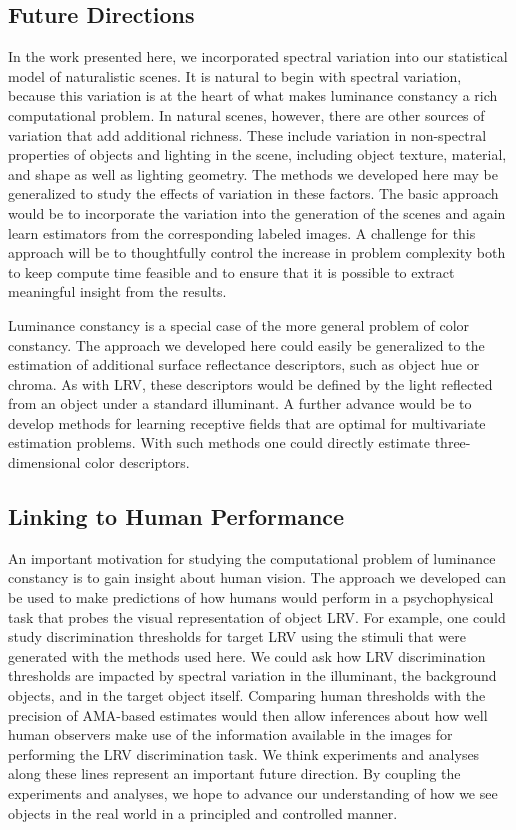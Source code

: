 \documentclass{jov}
\begin{document}
\subsection{Future Directions}
In the work presented here, we incorporated spectral variation into our statistical model
of naturalistic scenes.
It is natural to begin with spectral variation, because this variation is at the heart of
what makes luminance constancy a rich computational problem.
In natural scenes, however, there are other sources of variation that add additional
richness.
These include variation in non-spectral properties of objects and lighting in the scene, including
object texture, material, and shape as well as lighting geometry.
The methods we developed here may be generalized to study the effects of variation
in these factors.
The basic approach would be to incorporate the variation into the generation of the
scenes and again learn estimators from the corresponding labeled images.
A challenge for this approach will be to thoughtfully control the increase in problem
complexity both to keep compute time feasible and to ensure that it is possible to
extract meaningful insight from the results.

Luminance constancy is a special case of the more general problem of color constancy.
The approach we developed here could easily be generalized to the estimation of additional
surface reflectance descriptors, such as object hue or chroma.
As with LRV, these descriptors would be defined by the light reflected from an object 
under a standard illuminant.
A further advance would be to develop methods for learning receptive fields that are
optimal for multivariate estimation problems.
With such methods one could directly estimate three-dimensional color descriptors.

\subsection{Linking to Human Performance}

An important motivation for studying the computational problem of luminance constancy
is to gain insight about human vision.
The approach we developed can be used to make predictions of how humans would
perform in a psychophysical task that probes the visual representation of object LRV.
For example, one could study discrimination thresholds for target LRV using the
stimuli that were generated with the methods used
here.
We could ask how LRV discrimination thresholds are impacted by 
spectral variation in the illuminant, the background objects, and in the target object itself.
Comparing human thresholds with the precision of AMA-based estimates would then
allow inferences about how well human observers make use of the information available
in the images for performing the LRV discrimination task.
We think experiments and analyses along these lines represent an important future direction.
By coupling the experiments and analyses, we hope to advance our understanding
of how we see objects in the real world in a principled and controlled manner.
\end{document}
